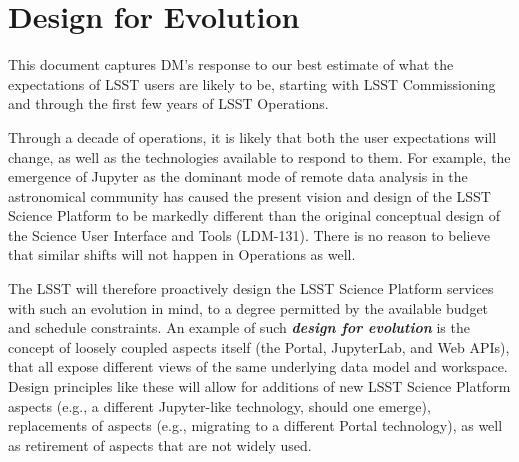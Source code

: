 \section{Design for Evolution\label{sec:evolution}}

This document captures DM's response to our best estimate of what the expectations of LSST users are likely to be, starting with LSST Commissioning and through the first few years of LSST Operations.

Through a decade of operations, it is likely that both the user expectations will change, as well as the technologies available to respond to them. For example, the emergence of Jupyter as the dominant mode of remote data analysis in the astronomical community has caused the present vision and design of the LSST Science Platform to be markedly different than the original conceptual design of the Science User Interface and Tools (LDM-131). There is no reason to believe that similar shifts will not happen in Operations as well.

The LSST will therefore proactively design the LSST Science Platform services with such an evolution in mind, to a degree permitted by the available budget and schedule constraints. An example of such \textbf\emph{design for evolution} is the concept of loosely coupled aspects itself (the Portal, JupyterLab, and Web APIs), that all expose different views of the same underlying data model and workspace. Design principles like these will allow for additions of new LSST Science Platform aspects (e.g., a different Jupyter-like technology, should one emerge), replacements of aspects (e.g., migrating to a different Portal technology), as well as retirement of aspects that are not widely used.